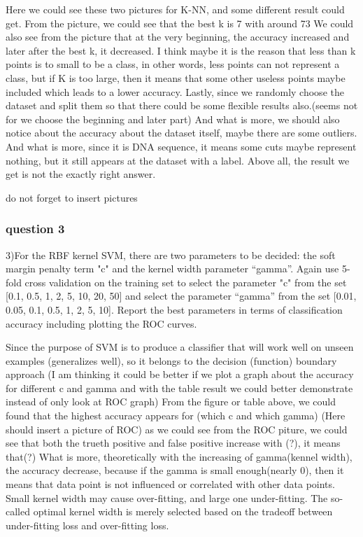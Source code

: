 \documentclass[]{article}
\begin{document}
Here we could see these two pictures for K-NN, and some different result could get. 
From the picture, we could see that the best k is 7 with around 73%
We could also see from the picture that at the very beginning, the accuracy increased and later after the best k, it decreased. I think maybe it is the reason that less than k points is to small to be a class, in other words, less points can not represent a class, but if K is too large, then it means that some other useless points maybe included which leads to a lower accuracy. Lastly, since we randomly choose the dataset and split them so that there could be some flexible results also.(seems not for we choose the beginning and later part)
And what is more, we should also notice about the accuracy about the dataset itself, maybe there are some outliers. And what is more, since it is DNA sequence, it means some cuts maybe represent nothing, but it still appears at the dataset with a label. Above all, the result we get is not the exactly right answer.


do not forget to insert pictures

\subsubsection{question 3}
3)For the RBF kernel SVM, there are two parameters to be decided: the soft margin penalty term "c" and the kernel width parameter “gamma”. Again use 5-fold cross validation on the training set to select the parameter "c" from the set [0.1, 0.5, 1, 2, 5, 10, 20, 50] and select the parameter “gamma” from the set [0.01, 0.05, 0.1, 0.5, 1, 2, 5, 10]. Report the best parameters in terms of classification accuracy including plotting the ROC curves.



Since the purpose of SVM is to produce a classifier that will work well on unseen examples (generalizes well), so it belongs to the decision (function) boundary approach 
(I am thinking it could be better if we plot a graph about the accuracy for different c and gamma and with the table result we could better demonstrate instead of only look at ROC graph) 
From the figure or table above, we could found that the highest accuracy appears for (which c and which gamma)
(Here should insert a picture of ROC)
as we could see from the ROC piture, we could see that both the trueth positive and false positive increase with (?), it means that(?)
What is more, theoretically with the increasing of gamma(kennel width), the accuracy decrease, because if the gamma is small enough(nearly 0), then it means that data point is not influenced or correlated with other data points. Small kernel width may cause over-fitting, and large one under-fitting. The so-called optimal kernel width is merely selected based on the tradeoff between under-fitting loss and over-fitting loss.
\end{document}
